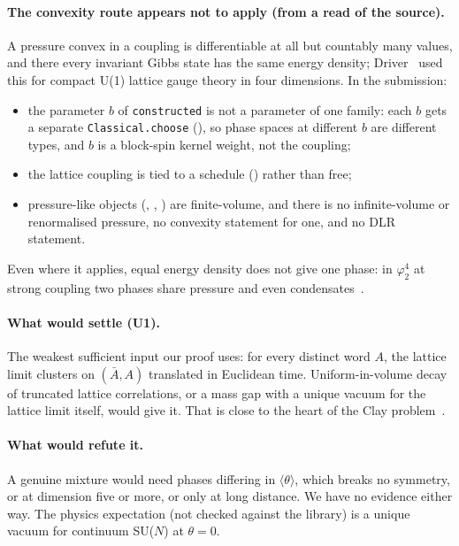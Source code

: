 \documentclass[11pt,a4paper]{article}
\newcommand{\ip}[1]{\langle #1\rangle}
\newcommand{\lean}[1]{\texttt{#1}}
\theoremstyle{plain}
\begin{document}
\paragraph{The convexity route appears not to apply (from a read of the source).} A pressure convex in a coupling is differentiable at all but countably many values, and there every invariant Gibbs state has the same energy density; Driver~\cite{Driver} used this for compact U(1) lattice gauge theory in four dimensions. In the submission:
\begin{itemize}
\item the parameter $b$ of \lean{constructed} is not a parameter of one family: each $b$ gets a separate \lean{Classical.choose} (), so phase spaces at different $b$ are different types, and $b$ is a block-spin kernel weight, not the coupling;
\item the lattice coupling is tied to a schedule () rather than free;
\item pressure-like objects (, , ) are finite-volume, and there is no infinite-volume or renormalised pressure, no convexity statement for one, and no DLR statement.
\end{itemize}
Even where it applies, equal energy density does not give one phase: in $\varphi^4_2$ at strong coupling two phases share pressure and even condensates~\cite{GJS}.

\paragraph{What would settle (U1).} The weakest sufficient input our proof uses: for every distinct word $A$, the lattice limit clusters on $(\bar A, A)$ translated in Euclidean time. Uniform-in-volume decay of truncated lattice correlations, or a mass gap with a unique vacuum for the lattice limit itself, would give it. That is close to the heart of the Clay problem~\cite{JaffeWitten}.

\paragraph{What would refute it.} A genuine mixture would need phases differing in $\ip{\theta}$, which breaks no symmetry, or at dimension five or more, or only at long distance. We have no evidence either way. The physics expectation (not checked against the library) is a unique vacuum for continuum SU($N$) at $\theta=0$.
\end{document}
